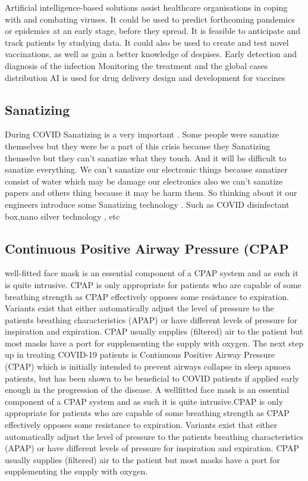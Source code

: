 \documentclass{article}
\begin{document}
Artificial intelligence-based solutions assist healthcare organisations in coping with and combating viruses. It could be used to predict forthcoming pandemics or epidemics at an early stage, before they spread. It is feasible to anticipate and track patients by studying data. It could also be used to create and test novel vaccinations, as well as gain a better knowledge of despises. Early detection and diagnosis of the infection Monitoring the treatment and the global cases distribution AI is used for drug delivery design and development for vaccines
\clearpage

\subsection{Sanatizing}
During COVID Sanatizing is a very important . Some people were sanatize themselves but they were be a part of this crisis because they Sanatizing themselve but they can’t sanatize what they touch. And it will be difficult to sanatize everything. We can’t sanatize our electronic things because sanatizer consist of water which may be damage our electronics also we can’t sanatize papers and others thing because it may be harm them. So thinking about it our engineers introduce some Sanatizing technology . Such as COVID disinfectant box,nano silver technology , etc


\subsection{Continuous Positive Airway Pressure (CPAP}

well-fitted face mask is an essential component of a CPAP system and as such it is quite intrusive. CPAP is only appropriate for patients who are capable of some breathing strength as CPAP effectively opposes some resistance to expiration. Variants exist that either automatically adjust the level of pressure to the patients breathing characteristics (APAP) or have different levels of pressure for inspiration and expiration. CPAP usually supplies (filtered) air to the patient but most masks have a port for supplementing the supply with oxygen.
The next step up in treating COVID-19 patients is Continuous Positive Airway Pressure (CPAP) which is initially intended to prevent airways collapse in sleep apnoea patients, but has been shown to be beneficial to COVID patients if applied early enough in the progression of the disease. A wellfitted face mask is an essential component of a CPAP system and as such it is quite intrusive.CPAP is only appropriate for patients who are capable of some breathing strength as CPAP effectively opposes some resistance to expiration. Variants exist that either automatically adjust the level of pressure to the patients breathing characteristics (APAP) or have different levels of pressure for inspiration and expiration. CPAP usually supplies (filtered) air to the patient but most masks have a port for supplementing the supply with oxygen.
\end{document}
